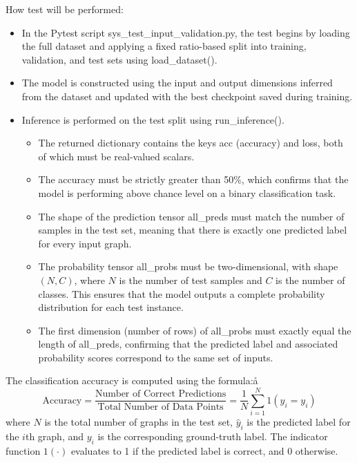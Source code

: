 \documentclass[12pt, titlepage]{article}
\begin{document}
\begin{enumerate}
How test will be performed: 
\begin{itemize}
    \item In the Pytest script sys\_test\_input\_validation.py, the test begins by loading the full dataset and applying a fixed ratio-based split into training, validation, and test sets using load\_dataset().
    \item The model is constructed using the input and output dimensions inferred from the dataset and updated with the best checkpoint saved during training.
    \item Inference is performed on the test split using run\_inference().
    \begin{itemize}
        \item The returned dictionary contains the keys acc (accuracy) and loss, both of which must be real-valued scalars.
        \item The accuracy must be strictly greater than 50\%, which confirms that the model is performing above chance level on a binary classification task.
        \item The shape of the prediction tensor all\_preds must match the number of samples in the test set, meaning that there is exactly one predicted label for every input graph.
        \item The probability tensor all\_probs must be two-dimensional, with shape \((N, C)\), where \(N\) is the number of test samples and \(C\) is the number of classes. This ensures that the model outputs a complete probability distribution for each test instance.
        \item The first dimension (number of rows) of all\_probs must exactly equal the length of all\_preds, confirming that the predicted label and associated probability scores correspond to the same set of inputs.
    \end{itemize}
\end{itemize}

The classification accuracy is computed using the formula:å
\[
\text{Accuracy} = \frac{\text{Number of Correct Predictions}}{\text{Total Number of Data Points}} = \frac{1}{N} \sum_{i=1}^{N} 1(\hat{y}_i = y_i)
\]
where \(N\) is the total number of graphs in the test set, \(\hat{y}_i\) is the predicted label for the \(i\)th graph, and \(y_i\) is the corresponding ground-truth label. The indicator function \(1(\cdot)\) evaluates to 1 if the predicted label is correct, and 0 otherwise.

\end{enumerate}
\end{document}
